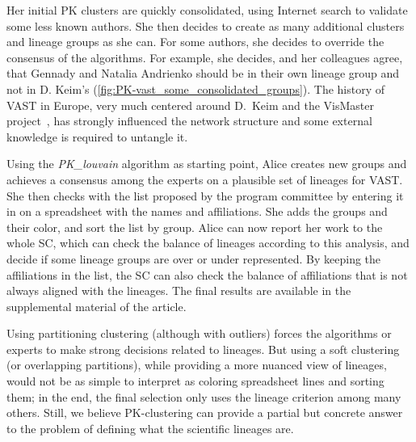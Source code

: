 Her initial PK clusters are quickly consolidated, using Internet search to validate some less known authors. She then decides to create as many additional clusters and lineage groups as she can.
For some authors, she decides to override the consensus of the algorithms. For example, she decides, and her colleagues agree, that Gennady and Natalia Andrienko should be in their own lineage group and not in D. Keim's (\autoref{fig:PK-vast_some_consolidated_groups}). The history of VAST in Europe, very much centered around D.\ Keim and the VisMaster project~\cite{VisMaster}, has strongly influenced the network structure and some external knowledge is required to untangle it.

Using the \emph{PK\_louvain} algorithm as starting point, Alice creates new groups and achieves a consensus among the experts on a plausible set of lineages for VAST.
She then checks with the list proposed by the program committee by entering it in on a spreadsheet with the names and affiliations. She adds the groups and their color, and sort the list by group.
Alice can now report her work to the whole SC, which can check the balance of lineages according to this analysis, and decide if some lineage groups are over or under represented.  By keeping the affiliations in the list, the SC can also check the balance of affiliations that is not always aligned with the lineages.  The final results are available in the supplemental material of the article.


Using partitioning clustering (although with outliers) forces the algorithms or experts to make strong decisions related to lineages. But using a soft clustering (or overlapping partitions), while providing a more nuanced view of lineages, would not be as simple to interpret as coloring spreadsheet lines and sorting them;
in the end, the final selection only uses the lineage criterion among many others.  Still, we believe PK-clustering can provide a partial but concrete answer to the problem of defining what the scientific lineages are.

